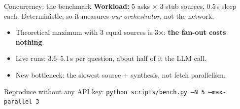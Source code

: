 \documentclass[aspectratio=169,10pt]{beamer}
\begin{document}
\begin{frame}{Concurrency: the benchmark}
  \textbf{Workload:} 5 asks $\times$ 3 stub sources, 0.5\,s sleep each.
  Deterministic, so it measures \emph{our orchestrator}, not the network.

  \vspace{0.9em}
  \begin{center}
  \end{center}

  \vspace{0.7em}
  \begin{itemize}\setlength\itemsep{0.35em}
    \item Theoretical maximum with 3 equal sources is 3$\times$: \textbf{the fan-out costs nothing}.
    \item Live runs: 3.6--5.1\,s per question, about half of it the LLM call.
    \item New bottleneck: the slowest source + synthesis, not fetch parallelism.
  \end{itemize}

  \vspace{0.3em}
  {\footnotesize Reproduce without any API key: \texttt{python scripts/bench.py --N 5 --max-parallel 3}}
\end{frame}
\end{document}
